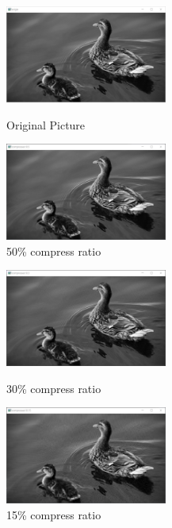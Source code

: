 \documentclass{article}
\begin{document}
            \begin{figure}[!htbp]
                \centering
                \begin{minipage}[t]{0.45\linewidth}
                    \centering
                    \includegraphics[height=3.2cm]{imgs/original.png}
                    \caption{Original Picture}
                \end{minipage}
                \hfill
                \begin{minipage}[t]{0.45\linewidth}
                    \centering
                    \includegraphics[height=3.2cm]{imgs/compressed-0.5.png}
                    \caption{50\% compress ratio}
                \end{minipage}
            \end{figure}
            \begin{figure}[htbp]
                \centering
                \begin{minipage}[t]{0.45\linewidth}
                    \centering
                    \includegraphics[height=3.2cm]{imgs/compressed-0.3.png}
                    \caption{30\% compress ratio}
                \end{minipage}
                \hfill
                \begin{minipage}[t]{0.45\linewidth}
                    \centering
                    \includegraphics[height=3.2cm]{imgs/compressed-0.15.png}
                    \caption{15\% compress ratio}
                \end{minipage}
            \end{figure}
\end{document}
